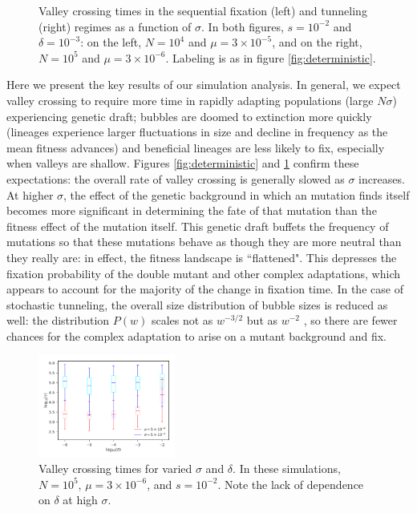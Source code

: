 \documentclass[10pt,twocolumn,twoside]{gsajnl}
\begin{document}
\begin{spacing}{1.5}
\begin{figure}[t]
\begin{subfigure}[b]{0.4\textwidth}
\end{subfigure}
\caption{Valley crossing times in the sequential fixation (left) and tunneling (right) regimes as a function of $\sigma$. In both figures, $s = 10^{-2}$ and $\delta = 10^{-3}$: on the left, $N = 10^4$ and $\mu = 3\times 10^{-5}$, and on the right, $N = 10^5$ and $\mu = 3\times 10^{-6}$. Labeling is as in figure \ref{fig:deterministic}.}
\label{fig:tunneling}
\end{figure}

Here we present the key results of our simulation analysis.
In general, we expect valley crossing to require more time in rapidly adapting populations (large $N \sigma$) experiencing genetic draft; bubbles are doomed to extinction more quickly (lineages experience larger fluctuations in size and decline in frequency as the mean fitness advances) and beneficial lineages are less likely to fix, especially when valleys are shallow.
Figures \ref{fig:deterministic} and \ref{fig:tunneling} confirm these expectations: the overall rate of valley crossing is generally slowed as $\sigma$ increases.
At higher $\sigma$, the effect of the genetic background in which an mutation finds itself becomes more significant in determining the fate of that mutation than the fitness effect of the mutation itself.
This genetic draft buffets the frequency of mutations so that these mutations behave as though they are more neutral than they really are: in effect, the fitness landscape is ``flattened".
This depresses the fixation probability of the double mutant and other complex adaptations, which appears to account for the majority of the change in fixation time.
In the case of stochastic tunneling, the overall size distribution of bubble sizes is reduced as well: the distribution $P(w)$ scales not as $w^{-3/2}$ but as $w^{-2}$ \citep{neher_shraiman_2011}, so there are fewer chances for the complex adaptation to arise on a mutant background and fix.

\begin{figure}[t]
\includegraphics[width=0.4\textwidth]{Figures/var_sigma_delta.pdf}
\caption{Valley crossing times for varied $\sigma$ and $\delta$. In these simulations, $N = 10^5$, $\mu = 3 \times 10^{-6}$, and $s = 10^{-2}$. Note the lack of dependence on $\delta$ at high $\sigma$.}
\label{fig:sigma_delta}
\end{figure}


\end{spacing}
\end{document}
